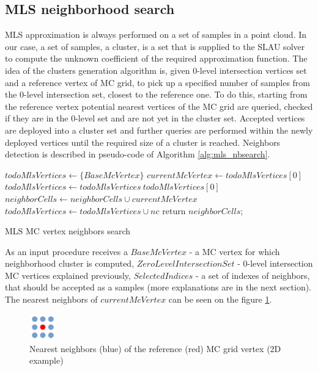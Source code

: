 \subsection{MLS neighborhood search}
MLS approximation is always performed on a set of samples in a point cloud. In our case, a set of samples, a cluster, is a set that is supplied to the SLAU solver to compute the unknown coefficient of the required approximation function. The idea of the clusters generation algorithm is, given 0-level intersection vertices set and a reference vertex of MC grid, to pick up a specified number of samples from the 0-level intersection set, closest to the reference one. To do this, starting from the reference vertex potential nearest vertices of the MC grid are queried, checked if they are in the 0-level set and are not yet in the cluster set. Accepted vertices are deployed into a cluster set and further queries are performed within the newly deployed vertices until the required size of a cluster is reached.
Neighbors detection is described in pseudo-code of Algorithm \ref{alg:mls_nbsearch}.
\begin{algorithm}[H]
	\scriptsize
	\begin{algorithmic}
		\State $todoMlsVertices \gets \{ BaseMcVertex \}$
			\State $currentMcVertex \gets todoMlsVertices[0]$
			\State $todoMlsVertices \gets todoMlsVertices \ todoMlsVertices[0]$
				\State $neighborCells \gets neighborCells \cup currentMcVertex$ 
			\EndIf
					\State $todoMlsVertices \gets todoMlsVertices \cup nc$
				\EndIf
			\EndFor
		\EndWhile
		\State return $neighborCells$;
	\end{algorithmic}
	\caption{MLS MC vertex neighbors search}
	\label{alg:mls_nbsearch}
\end{algorithm}
As an input procedure receives a $BaseMcVertex$ - a MC vertex for which neighborhood cluster is computed, $ZeroLevelIntersectionSet$ - 0-level intersection MC vertices explained previously, $SelectedIndices$ - a set of indexes of neighbors, that should be accepted as a samples (more explanations are in the next section). The nearest neighbors of $currentMcVertex$ can be seen on the figure \ref{fig:MCgridNearestNeighbors}.\\
\begin{figure}[H]
	\begin{center}
		\includegraphics[width=0.1\textwidth]{figures/nearestNeighbors.png}
	\end{center}
	\caption{Nearest neighbors (blue) of the reference (red) MC grid vertex (2D example) } \label{fig:MCgridNearestNeighbors}
\end{figure}

